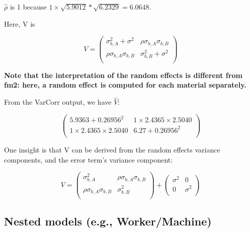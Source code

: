 \documentclass[12pt]{amsart}
\begin{document}
$\hat{\rho}$ is 1 because $1\times 
\sqrt{5.9012}*\sqrt{6.2329}=6.0648$.


Here, V is

\begin{equation}
V =
\begin{pmatrix}
\sigma^2_{b,A} + \sigma^2  &  \rho\sigma_{b,A}\sigma_{b,B}\\
\rho\sigma_{b,A}\sigma_{b,B} & \sigma^2_{b,B}+\sigma^2  \\       
\end{pmatrix}
\end{equation}

\textbf{Note that the interpretation of the random effects is different from fm2: here, a random effect is computed for each material separately.}


From the VarCorr output, we have $\hat{V}$:

\begin{equation}
\begin{pmatrix}
5.9363 + 0.26956^2  &  1 \times 2.4365\times 2.5040 \\
1 \times 2.4365\times 2.5040 & 6.27+0.26956^2  \\       
\end{pmatrix}
\end{equation}


One insight is that V can be derived from the random effects variance components, and the error term's variance component:

\begin{equation}
V=
\begin{pmatrix}
\sigma^2_{b,A} &\rho\sigma_{b,A}\sigma_{b,B}\\
\rho\sigma_{b,A}\sigma_{b,B} & \sigma^2_{b,B}\\
\end{pmatrix}
+
\begin{pmatrix}
\sigma^2 & 0\\
0 & \sigma^2\\
\end{pmatrix}
\end{equation}

\subsection{Nested models (e.g., Worker/Machine)}
\end{document}
